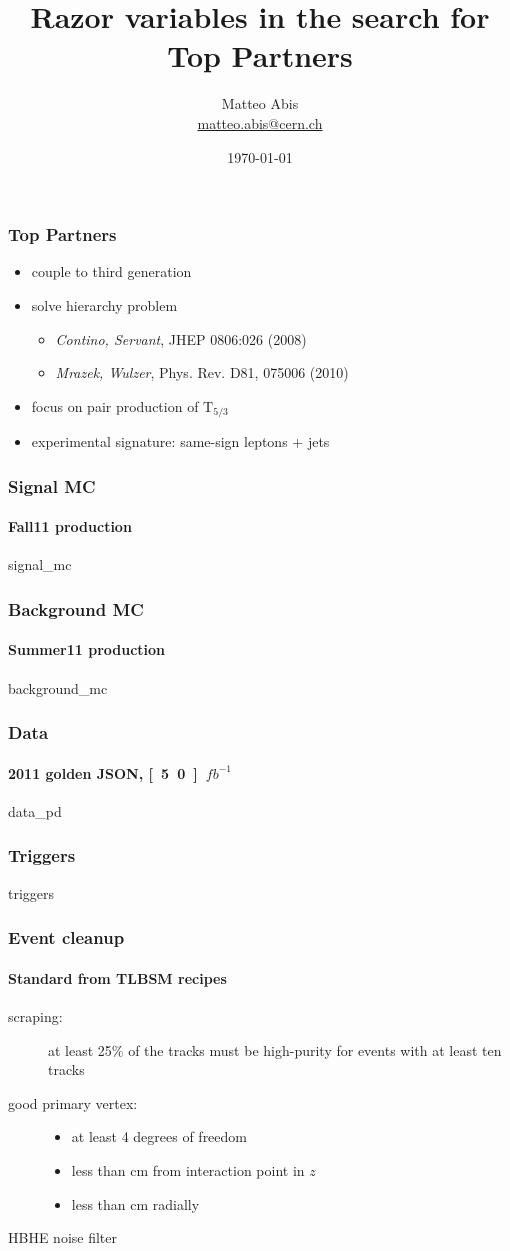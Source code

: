 \documentclass[ukenglish]{beamer}
\title[Razor for Top Partners]{Razor variables in the search for Top
Partners}
\author{Matteo Abis\\
\url{matteo.abis@cern.ch}}
\institute{Università di Padova and INFN}
\date{\today}
\begin{document}
\begin{frame}
  \titlepage
\end{frame}
 
\begin{frame}
    \frametitle{Top Partners}
    \begin{itemize}
        \item couple to third generation
        \item solve hierarchy problem
            \begin{itemize}
                \item \emph{Contino, Servant}, JHEP 0806:026 (2008)
                \item \emph{Mrazek, Wulzer}, Phys. Rev. D81, 075006 (2010)
            \end{itemize}
        \item focus on pair production of $\mathrm{T}_{5/3}$
        \item experimental signature: same-sign leptons + jets
    \end{itemize}
\end{frame}

\begin{frame}
    \frametitle{Signal MC}
    \framesubtitle{Fall11 production}
    {signal_mc}
\end{frame}

\begin{frame}
    \frametitle{Background MC}
    \framesubtitle{Summer11 production}
    {background_mc}
\end{frame}

\begin{frame}
    \frametitle{Data}
    \framesubtitle{2011 golden JSON, \unit[5.0]{$fb^{-1}$}}
    {data_pd}
\end{frame}

\begin{frame}
    \frametitle{Triggers}
    {triggers}
\end{frame}

\begin{frame}
    \frametitle{Event cleanup}
    \framesubtitle{Standard from TLBSM recipes}
    \begin{description}
        \item[scraping:] at least 25\% of the tracks must be high-purity for events
            with at least ten tracks
        \item[good primary vertex:] 
            \begin{itemize}
                \item at least 4 degrees of freedom
                \item less than \unit[25]{cm} from interaction point in $z$
                \item less than \unit[2]{cm} radially
            \end{itemize}
        \item[HBHE noise filter] 
    \end{description}
\end{frame}
\end{document}
